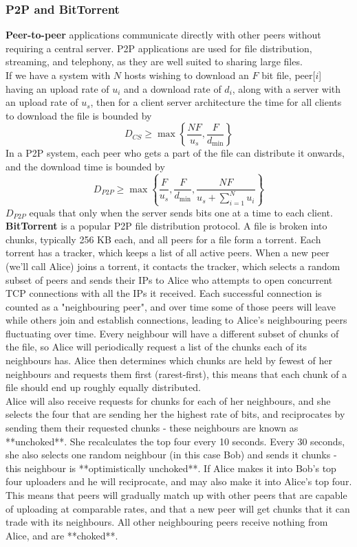 \subsubsection{P2P and BitTorrent}
\textbf{Peer-to-peer} applications communicate directly with other peers without requiring a central server. P2P applications are used for file distribution, streaming, and telephony, as they are well suited to sharing large files.\\
If we have a system with $N$ hosts wishing to download an $F$ bit file, peer[$i$] having an upload rate of $u_i$ and a download rate of $d_i$, along with a server with an upload rate of $u_s$, then for a client server architecture the time for all clients to download the file is bounded by
$$
	D_{CS}\ge\max\left\{\frac{NF}{u_s},\frac{F}{d_{\min}}\right\}
$$
In a P2P system, each peer who gets a part of the file can distribute it onwards, and the download time is bounded by
$$
	D_{P2P}\ge\max\left\{\frac{F}{u_s},\frac{F}{d_{\min}},\frac{NF}{u_s+\sum^N_{i=1}u_i}\right\}
$$
$D_{P2P}$ equals that only when the server sends bits one at a time to each client.\\
\textbf{BitTorrent} is a popular P2P file distribution protocol. A file is broken into chunks, typically 256 KB each, and all peers for a file form a torrent. Each torrent has a tracker, which keeps a list of all active peers. When a new peer (we'll call Alice) joins a torrent, it contacts the tracker, which selects a random subset of peers and sends their IPs to Alice who attempts to open concurrent TCP connections with all the IPs it received. Each successful connection is counted as a "neighbouring peer", and over time some of those peers will leave while others join and establish connections, leading to Alice's neighbouring peers fluctuating over time. Every neighbour will have a different subset of chunks of the file, so Alice will periodically request a list of the chunks each of its neighbours has. Alice then determines which chunks are held by fewest of her neighbours and requests them first (rarest-first), this means that each chunk of a file should end up roughly equally distributed.\\
Alice will also receive requests for chunks for each of her neighbours, and she selects the four that are sending her the highest rate of bits, and reciprocates by sending them their requested chunks - these neighbours are known as **unchoked**. She recalculates the top four every 10 seconds. Every 30 seconds, she also selects one random neighbour (in this case Bob) and sends it chunks - this neighbour is **optimistically unchoked**. If Alice makes it into Bob's top four uploaders and he will reciprocate, and may also make it into Alice's top four. This means that peers will gradually match up with other peers that are capable of uploading at comparable rates, and that a new peer will get chunks that it can trade with its neighbours. All other neighbouring peers receive nothing from Alice, and are **choked**.


